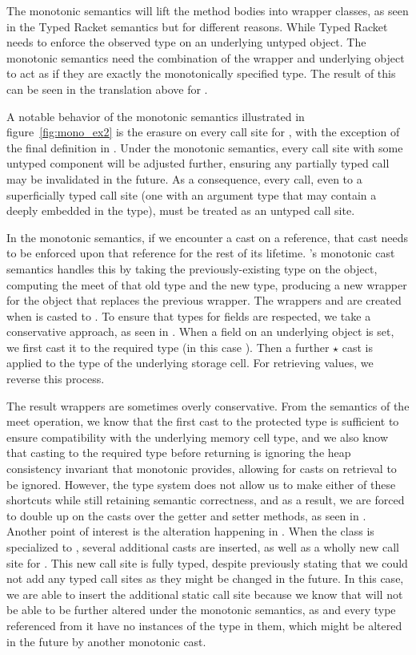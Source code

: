 \documentclass[a4paper,USenglish]{tex/lipics-v2016}
\begin{document}
The monotonic semantics will lift the method bodies into wrapper classes, as seen in
the Typed Racket semantics but for different reasons. While Typed Racket
needs to enforce the observed type on an underlying untyped object. The
monotonic semantics need the combination of the wrapper and underlying object 
to act as if they are exactly the monotonically specified type. 
The result of this can be seen in the translation above for \m.

A notable behavior of the monotonic semantics illustrated in figure~\ref{fig:mono_ex2}
is the erasure on every call site for \m, with the exception of the final definition in . 
Under the monotonic semantics, every call site with some untyped component
will be adjusted further, ensuring any partially typed call may be invalidated in the future. 
As a consequence, every call, even to a superficially typed call site (one with an argument
type that may contain a \any deeply embedded in the type), must be treated as an untyped call site.

In the monotonic semantics, if we encounter a cast on a reference, that cast needs to be
enforced upon that reference for the rest of its lifetime. \kafka's monotonic
cast semantics handles this by taking the previously-existing type on the object,
computing the meet of that old type and the new type, producing a new
wrapper for the object that replaces the previous wrapper. The wrappers  and 
are created when \a is casted to .
To ensure that types for fields are respected, we take a conservative approach, 
as seen in . When a field on an underlying object is set, we first cast
it to the required type (in this case ). Then a further $\star$ cast is applied 
to the type of the underlying storage cell. For retrieving values, we reverse this process.

The result wrappers are sometimes overly conservative. From the semantics of the meet operation, we
know that the first cast to the protected type is sufficient to ensure 
compatibility with the underlying memory cell type, and we also know that casting
to the required type before returning is ignoring the heap consistency invariant 
that monotonic provides, allowing for casts on retrieval to be ignored. However,
the \kafka type system does not allow us to make either of these shortcuts while
still retaining semantic correctness, and as a result, we are forced to double 
up on the casts over the getter and setter methods, as seen in .
Another point of interest is the alteration happening in . When the class 
is specialized to , several additional casts
are inserted, as well as a wholly new call site for \m. This new
call site is fully typed, despite previously stating that we could not add any 
typed call sites as they might be changed in the future.
In this case, we are able to insert the additional static call site because we 
know that  will not be able to be further altered under the monotonic 
semantics, as  and every type referenced from it have no instances of the
type \any in them, which might be altered in the future by another monotonic
cast.
\end{document}
